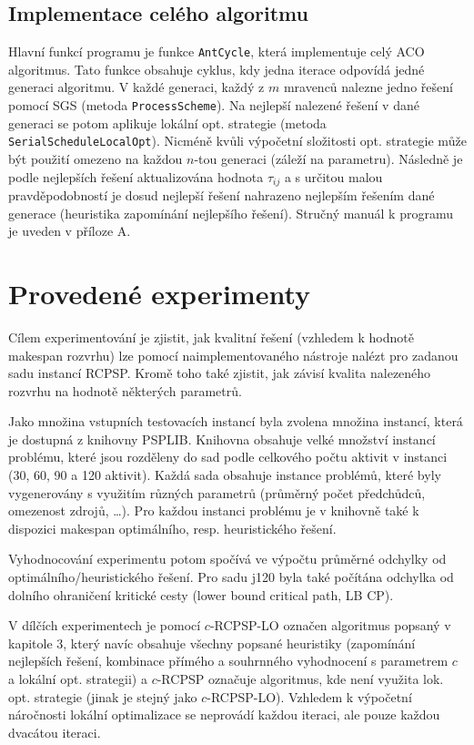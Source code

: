 \documentclass[a4paper,12pt]{article}
\begin{document}
\subsection{Implementace celého algoritmu}
Hlavní funkcí programu je funkce \texttt{AntCycle}, která implementuje celý ACO algoritmus. 
Tato funkce obsahuje cyklus, kdy jedna iterace odpovídá jedné generaci algoritmu. V každé
generaci, každý z $m$ mravenců nalezne jedno řešení pomocí SGS (metoda \texttt{ProcessScheme}).
Na nejlepší nalezené řešení v dané generaci se potom aplikuje lokální opt. strategie 
(metoda \texttt{SerialScheduleLocalOpt}). Nicméně kvůli výpočetní složitosti opt. strategie
může být použití omezeno na každou $n$-tou generaci (záleží na parametru). Následně je 
podle nejlepších řešení aktualizována hodnota $\tau_{ij}$ a s určitou malou pravděpodobností
je dosud nejlepší řešení nahrazeno nejlepším řešením dané generace (heuristika zapomínání
nejlepšího řešení). Stručný manuál k programu je uveden v příloze A.

\section{Provedené experimenty}
Cílem experimentování je zjistit, jak kvalitní řešení (vzhledem k hodnotě makespan rozvrhu) lze 
pomocí naimplementovaného nástroje nalézt pro zadanou sadu instancí RCPSP. Kromě toho také
zjistit, jak závisí kvalita nalezeného rozvrhu na hodnotě některých parametrů.

Jako množina vstupních testovacích instancí byla zvolena množina instancí, která je dostupná
z knihovny PSPLIB. Knihovna obsahuje velké množství instancí problému, které jsou rozděleny do sad podle
celkového počtu aktivit v instanci (30, 60, 90 a 120 aktivit). Každá sada obsahuje instance problémů,
které byly vygenerovány s využitím různých parametrů (průměrný počet předchůdců, omezenost zdrojů, \dots).
Pro každou instanci problému je v knihovně také k dispozici makespan optimálního, resp. heuristického řešení.

Vyhodnocování experimentu potom spočívá ve výpočtu průměrné odchylky od optimálního/heuristického řešení.
Pro sadu j120 byla také počítána odchylka od dolního ohraničení kritické cesty (lower bound critical path, LB CP).

V dílčích experimentech je pomocí $c$-RCPSP-LO označen algoritmus popsaný v kapitole 3, který navíc
obsahuje všechny popsané heuristiky (zapomínání nejlepších řešení, kombinace přímého a souhrnného vyhodnocení s parametrem $c$ a
lokální opt. strategii) a $c$-RCPSP označuje algoritmus, kde není využita lok. opt. strategie (jinak 
je stejný jako $c$-RCPSP-LO). Vzhledem k výpočetní náročnosti lokální optimalizace se neprovádí
každou iteraci, ale pouze každou dvacátou iteraci.
\end{document}
